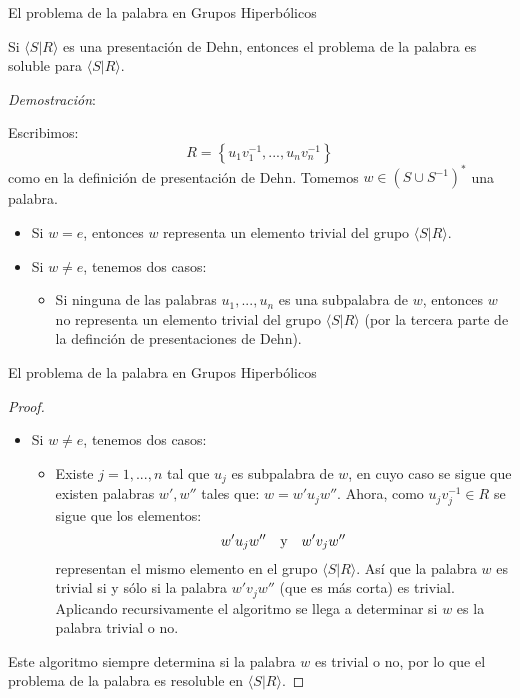 \documentclass[xcolor=dvipsnames]{beamer}
\theoremstyle{largebreak}
\newcommand{\gen}[1]{\ensuremath{\langle#1\rangle}}
\begin{document}
\begin{frame}{El problema de la palabra en Grupos Hiperbólicos}
    \begin{propo}
        Si $\gen{S|R}$ es una presentación de Dehn, entonces el problema de la palabra es soluble para $\gen{S|R}$.
    \end{propo}
    \textit{Demostración}:

    Escribimos:
    \begin{equation*}
        R=\left\{u_1v_1^{-1},...,u_nv_n^{-1} \right\}
    \end{equation*}
    como en la definición de presentación de Dehn. Tomemos $w\in(S\cup S^{-1})^*$ una palabra.
    \begin{itemize}
        \item Si $w=e$, entonces $w$ representa un elemento trivial del grupo $\gen{S|R}$.
        \item Si $w\neq e$, tenemos dos casos:
        \begin{itemize}
            \item Si ninguna de las palabras $u_1,...,u_n$ es una subpalabra de $w$, entonces $w$ no representa un elemento trivial del grupo $\gen{S|R}$ (por la tercera parte de la definción de presentaciones de Dehn).
        \end{itemize}
    \end{itemize}
\end{frame}

\begin{frame}{El problema de la palabra en Grupos Hiperbólicos}
    \begin{proof}
        \begin{itemize}
            \item Si $w\neq e$, tenemos dos casos:
            \begin{itemize}
                \item Existe $j=1,...,n$ tal que $u_j$ es subpalabra de $w$, en cuyo caso se sigue que existen palabras $w',w''$ tales que: $w=w'u_jw''$. Ahora, como $u_jv_j^{-1}\in R$ se sigue que los elementos:
                \begin{equation*}
                    w'u_jw''\quad\textup{y}\quad w'v_jw''
                \end{equation*}
                representan el mismo elemento en el grupo $\gen{S|R}$. Así que la palabra $w$ es trivial si y sólo si la palabra $w'v_jw''$ (que es más corta) es trivial. Aplicando recursivamente el algoritmo se llega a determinar si $w$ es la palabra trivial o no.
            \end{itemize}
        \end{itemize}
        Este algoritmo siempre determina si la palabra $w$ es trivial o no, por lo que el problema de la palabra es resoluble en $\gen{S|R}$.
    \end{proof}
\end{frame}
\end{document}
